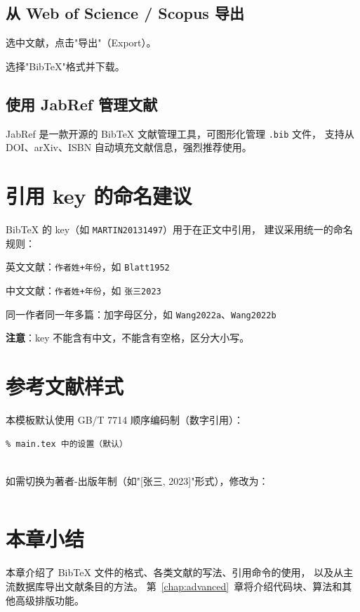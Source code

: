 \subsection{从 Web of Science / Scopus 导出}

\begin{compactenum}
    \item 选中文献，点击"导出"（Export）。
    \item 选择"BibTeX"格式并下载。
\end{compactenum}

\subsection{使用 JabRef 管理文献}

JabRef 是一款开源的 BibTeX 文献管理工具，可图形化管理 \texttt{.bib} 文件，
支持从 DOI、arXiv、ISBN 自动填充文献信息，强烈推荐使用。

\section{引用 key 的命名建议}

BibTeX 的 key（如 \texttt{MARTIN20131497}）用于在正文中引用，
建议采用统一的命名规则：

\begin{compactitem}
    \item 英文文献：\texttt{作者姓+年份}，如 \texttt{Blatt1952}
    \item 中文文献：\texttt{作者姓+年份}，如 \texttt{张三2023}
    \item 同一作者同一年多篇：加字母区分，如 \texttt{Wang2022a}、\texttt{Wang2022b}
\end{compactitem}

\textbf{注意}：key 不能含有中文，不能含有空格，区分大小写。

\section{参考文献样式}

本模板默认使用 GB/T 7714 顺序编码制（数字引用）：

\begin{verbatim}
% main.tex 中的设置（默认）


\end{verbatim}

如需切换为著者-出版年制（如"[张三, 2023]"形式），修改为：

\begin{verbatim}

\end{verbatim}

\section{本章小结}

本章介绍了 BibTeX 文件的格式、各类文献的写法、引用命令的使用，
以及从主流数据库导出文献条目的方法。
第~\ref{chap:advanced}~章将介绍代码块、算法和其他高级排版功能。
